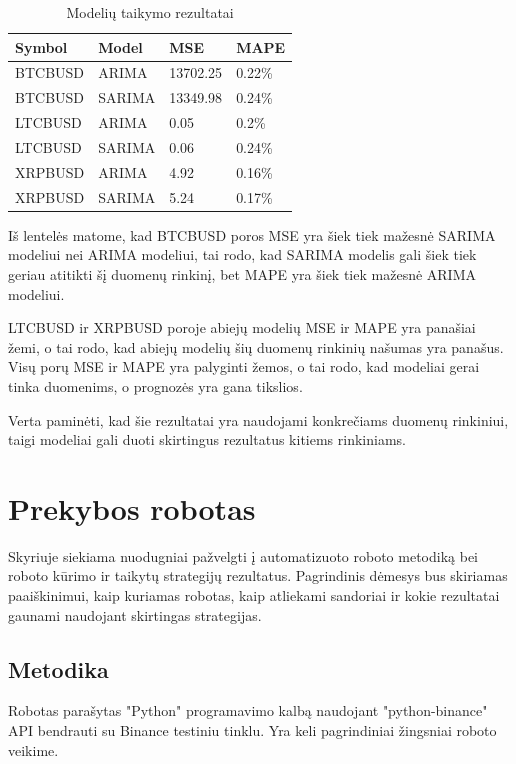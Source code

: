 \documentclass{VUMIFInfKursinis}
\begin{document}
\begin{table}[H]
  \centering
  \begin{tabularx}{\linewidth}{|X|X|X|X|}
    \hline
    Symbol  & Model  & MSE      & MAPE   \\
    \hline
    \hline
    BTCBUSD & ARIMA  & 13702.25 & 0.22\% \\
    \hline
    BTCBUSD & SARIMA & 13349.98 & 0.24\% \\
    \hline
    \hline
    LTCBUSD & ARIMA  & 0.05     & 0.2\%  \\
    \hline
    LTCBUSD & SARIMA & 0.06     & 0.24\% \\
    \hline
    \hline
    XRPBUSD & ARIMA  & 4.92     & 0.16\% \\
    \hline
    XRPBUSD & SARIMA & 5.24     & 0.17\% \\
    \hline
  \end{tabularx}
  \caption{Modelių taikymo rezultatai}
  \label{table:rezultatai}
\end{table}

Iš lentelės matome, kad BTCBUSD poros MSE yra šiek tiek mažesnė SARIMA modeliui nei ARIMA modeliui, tai rodo, kad SARIMA modelis gali šiek tiek geriau atitikti šį duomenų rinkinį, bet MAPE yra šiek tiek mažesnė ARIMA modeliui.

LTCBUSD ir XRPBUSD poroje abiejų modelių MSE ir MAPE yra panašiai žemi, o tai rodo, kad abiejų modelių šių duomenų rinkinių našumas yra panašus. Visų porų MSE ir MAPE yra palyginti žemos, o tai rodo, kad modeliai gerai tinka duomenims, o prognozės yra gana tikslios.

Verta paminėti, kad šie rezultatai yra naudojami konkrečiams duomenų rinkiniui, taigi modeliai gali duoti skirtingus rezultatus kitiems rinkiniams.

\section{Prekybos robotas}
Skyriuje siekiama nuodugniai pažvelgti į automatizuoto roboto metodiką bei roboto kūrimo ir taikytų strategijų rezultatus.
Pagrindinis dėmesys bus skiriamas paaiškinimui, kaip kuriamas robotas, kaip atliekami sandoriai ir kokie rezultatai gaunami naudojant skirtingas strategijas.

\subsection{Metodika}
Robotas parašytas "Python" programavimo kalbą naudojant "python-binance" API bendrauti su Binance testiniu tinklu. 
Yra keli pagrindiniai žingsniai roboto veikime.
\end{document}
